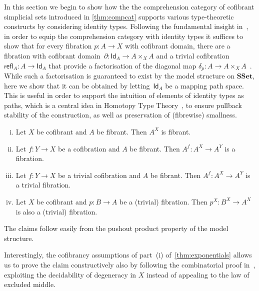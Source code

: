 \documentclass[reqno,10pt,a4paper,oneside]{amsart}
\makeatletter
\renewenvironment{proof}[1][\proofname] {\par\pushQED{\qed}\normalfont\topsep6\p@\@plus6\p@\relax\trivlist\item[\hskip\labelsep\bf#1\@addpunct{.}]\ignorespaces}{\popQED\endtrivlist\@endpefalse}
\numberwithin{equation}{section}
\theoremstyle{mythm}
\theoremstyle{mydef}
\theoremstyle{myrmk}
\newcommand{\co}{\colon}
\newcommand{\SSet}{\mathbf{SSet}}
\newcommand{\Id}{\mathsf{Id}}
\makeatother
\begin{document}
In this section we begin to show how the the comprehension category of cofibrant simplicial
sets introduced in \cref{thm:compcat} supports 
various type-theoretic constructs by considering identity types. Following the fundamental insight in~\cite{awodey-warren:homotopy-idtype}, in order to equip the comprehension category  with identity types it suffices to show that
for every fibration $p \co A \to X$ with cofibrant domain, there are a  fibration with cofibrant domain~$\partial \co \Id_A \to A \times_X A$ and a trivial cofibration $\mathsf{refl}_A \co A \to \Id_A$ that provide a factorisation of the diagonal map $\delta_p \co A \to A \times_X A$~\cite{LumsdaineP:locuoc}. While such a factorisation is guaranteed to exist by the model structure on $\SSet$, here we show that it can be obtained by letting~$\Id_A$ be a mapping path space. 
This is useful in order to support the intuition of elements of identity types as paths, which is a central idea in Homotopy Type Theory~\cite{hottbook}, to ensure pullback stability
of the construction, as well as preservation of (fibrewise) smallness.



\begin{lemma} \hfill 
 \label{thm:exponentials}
\begin{enumerate}[(i)] 
\item Let $X$ be cofibrant and $A$ be fibrant.  Then $A^X$ is fibrant.
\item Let $f \co Y \rightarrow X$ be a cofibration and $A$ be fibrant. Then $A^f \co A^X \rightarrow A^Y$ is a fibration.
\item Let $f \co Y \rightarrow X$ be a trivial cofibration and $A$ be fibrant.  Then $A^f \co A^X \rightarrow A^Y$ is a trivial fibration.
\item Let $X$ be cofibrant and $p \co B \rightarrow A$ be a (trivial) fibration. Then $p^X \co B^X \rightarrow A^X$ is also a (trivial) fibration.
\end{enumerate}
\end{lemma}

\begin{proof} The claims follow easily from the pushout product property of the model structure.
\end{proof}
 
Interestingly, the cofibrancy assumptions of part~(i) of~\cref{thm:exponentials} allows
us to prove the claim constructively also by following the combinatorial proof in~\cite{MayJP:simoat}, exploiting the decidability of degeneracy in $X$ instead of appealing to the law of excluded middle.
\end{document}
